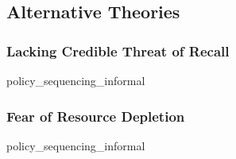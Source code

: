 \documentclass[hyphens, crop=false]{standalone}
\begin{document}
%		
		
	\subsection*{Alternative Theories}
		
		\subsubsection*{Lacking Credible Threat of Recall}
			{policy_sequencing_informal}
			
		\subsubsection*{Fear of Resource Depletion}
			{policy_sequencing_informal}
		
	
		
	\newpage
	\printbibliography
	
	
	
\end{document}
